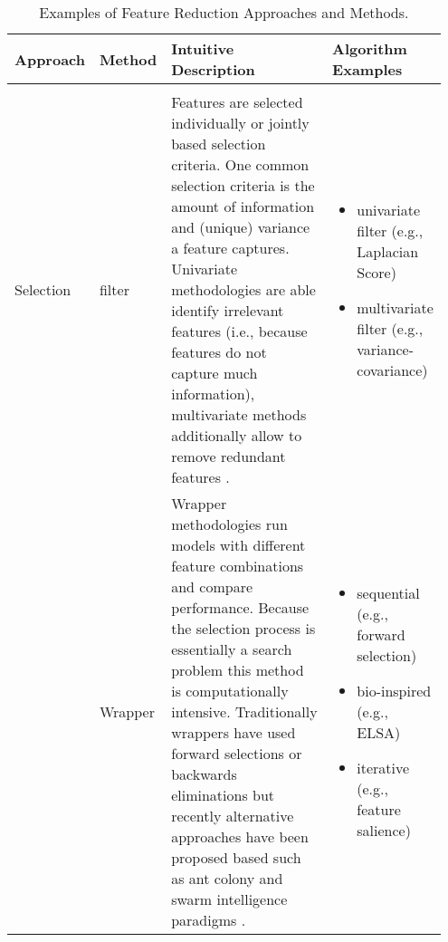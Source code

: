 \begin{sidewaystable*}[!hbtp]
    \centering
    \caption{Examples of Feature Reduction Approaches and Methods.}
    \label{tab:featureReduction} 
    \begin{tabular}{
    >{\raggedright\arraybackslash}p{0.08\linewidth} 
    >{\raggedright\arraybackslash}p{0.08\linewidth} 
    >{\raggedright\arraybackslash}p{0.54\linewidth} 
    >{\raggedright\arraybackslash}p{0.25\linewidth}
    }
        \hline 
        Approach & Method & Intuitive Description & Algorithm Examples \\ 
        \hline \\ [-0.5em]
        
        Selection \linebreak & 
        filter \linebreak & 
        Features are selected individually or jointly based selection criteria. One common selection criteria is the amount of information and (unique) variance a feature captures. Univariate methodologies are able identify irrelevant features (i.e., because features do not capture much information), multivariate methods additionally allow to remove redundant features \citep[i.e., because features capture the same information][]{yu2004}. \linebreak &
        \vspace{-1em}
        \begin{itemize}[nosep,leftmargin=*,label={--}]
            \item univariate filter (e.g., Laplacian Score)
            \item multivariate filter (e.g., variance-covariance)
        \end{itemize}
         \linebreak \\ 
        
        \linebreak & 
        Wrapper \linebreak & 
        Wrapper methodologies run models with different feature combinations and compare performance. Because the selection process is essentially a search problem this method is computationally intensive. Traditionally wrappers have used forward selections or backwards eliminations but recently alternative approaches have been proposed based such as ant colony and swarm intelligence paradigms \citep[e.g., see][]{tang2014}. \linebreak &
        \vspace{-1em}
        \begin{itemize}[nosep,leftmargin=*,label={--}]
            \item sequential (e.g., forward selection)
            \item bio-inspired (e.g., ELSA)
            \item iterative (e.g., feature salience)
        \end{itemize}
         \linebreak \\ 
        

\end{tabular}
\end{sidewaystable*}
